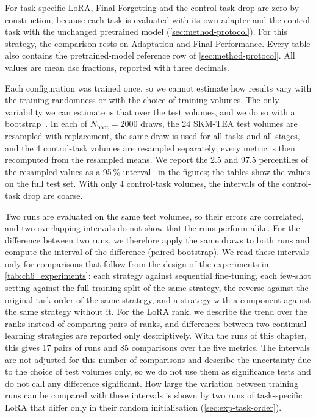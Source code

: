 For task-specific LoRA, Final Forgetting and the control-task drop are zero by construction, because each task is evaluated with its own adapter and the control task with the unchanged pretrained model (\cref{sec:method-protocol}).
For this strategy, the comparison rests on Adaptation and Final Performance.
Every table also contains the pretrained-model reference row of \cref{sec:method-protocol}.
All values are mean \gls{dsc} fractions, reported with three decimals.

Each configuration was trained once, so we cannot estimate how results vary with the training randomness or with the choice of training volumes.
The only variability we can estimate is that over the test volumes, and we do so with a bootstrap~\cite{efron1993bootstrap}.
In each of $N_{\mathrm{boot}} = 2000$ draws, the 24 SKM-TEA test volumes are resampled with replacement, the same draw is used for all tasks and all stages, and the 4 control-task volumes are resampled separately; every metric is then recomputed from the resampled means.
We report the 2.5 and 97.5 percentiles of the resampled values as a 95\,\% interval~\cite{efron1993bootstrap} in the figures; the tables show the values on the full test set.
With only 4 control-task volumes, the intervals of the control-task drop are coarse.

Two runs are evaluated on the same test volumes, so their errors are correlated, and two overlapping intervals do not show that the runs perform alike.
For the difference between two runs, we therefore apply the same draws to both runs and compute the interval of the difference (paired bootstrap).
We read these intervals only for comparisons that follow from the design of the experiments in \cref{tab:ch6_experiments}: each strategy against sequential fine-tuning, each few-shot setting against the full training split of the same strategy, the reverse against the original task order of the same strategy, and a strategy with a component against the same strategy without it.
For the LoRA rank, we describe the trend over the ranks instead of comparing pairs of ranks, and differences between two continual-learning strategies are reported only descriptively.
With the runs of this chapter, this gives 17 pairs of runs and 85 comparisons over the five metrics.
The intervals are not adjusted for this number of comparisons and describe the uncertainty due to the choice of test volumes only, so we do not use them as significance tests and do not call any difference significant.
How large the variation between training runs can be compared with these intervals is shown by two runs of task-specific LoRA that differ only in their random initialisation (\cref{sec:exp-task-order}).

